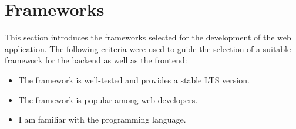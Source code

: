 \section{Frameworks}
\label{sec:methodology:frameworks}
This section introduces the frameworks selected for the development of the web application. The following criteria were used to guide the selection of a suitable framework for the backend as well as the frontend:
\begin{itemize}
    \item The framework is well-tested and provides a stable \ac{LTS} version.
    \item The framework is popular among web developers.
    \item I am familiar with the programming language.
\end{itemize}

